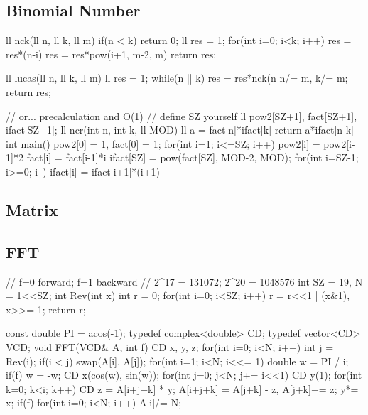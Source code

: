 \subsection{Binomial Number}
\begin{cpp}
ll nck(ll n, ll k, ll m){
  if(n < k) return 0;
  ll res = 1;
  for(int i=0; i<k; i++){
    res = res*(n-i) %
    res = res*pow(i+1, m-2, m) %
  }
  return res;
}

ll lucas(ll n, ll k, ll m){
  ll res = 1;
  while(n || k){
    res = res*nck(n%
    n/= m, k/= m;
  }
  return res;
}

// or... precalculation and O(1)
// define SZ yourself
ll pow2[SZ+1], fact[SZ+1], ifact[SZ+1];
ll ncr(int n, int k, ll MOD){
    ll a = fact[n]*ifact[k] %
    return a*ifact[n-k] %
}
int main(){
  pow2[0] = 1, fact[0] = 1;
  for(int i=1; i<=SZ; i++){
    pow2[i] = pow2[i-1]*2 %
    fact[i] = fact[i-1]*i %
  }
  ifact[SZ] = pow(fact[SZ], MOD-2, MOD);
  for(int i=SZ-1; i>=0; i--)
    ifact[i] = ifact[i+1]*(i+1)%
}
\end{cpp}

\subsection{Matrix}

\subsection{FFT}
\begin{cpp}
// f=0 forward; f=1 backward
// 2^17 = 131072; 2^20 = 1048576
int SZ = 19, N = 1<<SZ;
int Rev(int x){
  int r = 0;
  for(int i=0; i<SZ; i++) r = r<<1 | (x&1), x>>= 1;
  return r;
}

const double PI = acos(-1);
typedef complex<double> CD;
typedef vector<CD> VCD;
void FFT(VCD& A, int f){
  CD x, y, z;
  for(int i=0; i<N; i++){
    int j = Rev(i);
    if(i < j) swap(A[i], A[j]);
  }
  for(int i=1; i<N; i<<= 1){
    double w = PI / i;
    if(f) w = -w;
    CD x(cos(w), sin(w));
    for(int j=0; j<N; j+= i<<1){
      CD y(1);
      for(int k=0; k<i; k++){
        CD z = A[i+j+k] * y;
        A[i+j+k] = A[j+k] - z, A[j+k]+= z;
        y*= x;
      }
    }
  }
  if(f) for(int i=0; i<N; i++) A[i]/= N;
}
\end{cpp}

